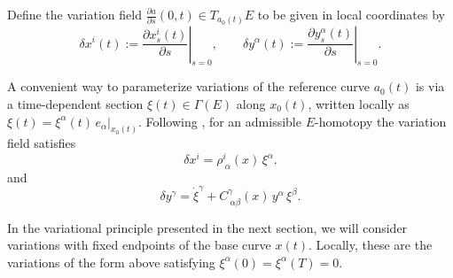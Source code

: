 \documentclass[11pt,a4paper]{article}
\theoremstyle{definition}
\begin{document}
Define the variation field $\frac{\partial a}{\partial s}(0,t)\in T_{a_{0}(t)}E$ to be given in local coordinates by 
\[
\delta x^i(t) := \left.\frac{\partial x_s^i(t)}{\partial s}\right|_{s=0},\qquad
\delta y^\alpha(t) := \left.\frac{\partial y_s^\alpha(t)}{\partial s}\right|_{s=0}.
\]

A convenient way to parameterize variations of the reference curve $a_{0}(t)$ is via a time-dependent
section $\xi(t) \in \Gamma(E)$ along $x_{0}(t)$, written locally as
$\xi(t) = \xi^\alpha(t)\,e_\alpha|_{x_{0}(t)}$. Following \cite{martinez2008variational}, for an admissible $E$-homotopy the variation field satisfies
\[
\delta x^i = \rho^i_{\ \alpha}(x)\,\xi^\alpha.
\]
and
\[
\delta y^\gamma = \dot{\xi}^\gamma + C^\gamma_{\ \alpha\beta}(x)\,y^\alpha\,\xi^\beta.
\]




In the variational principle presented in the next section, we will consider variations with fixed endpoints of the base curve $x(t)$. Locally, these are the variations of the form above satisfying $\xi^\alpha(0)=\xi^\alpha(T)=0$. %
\end{document}
